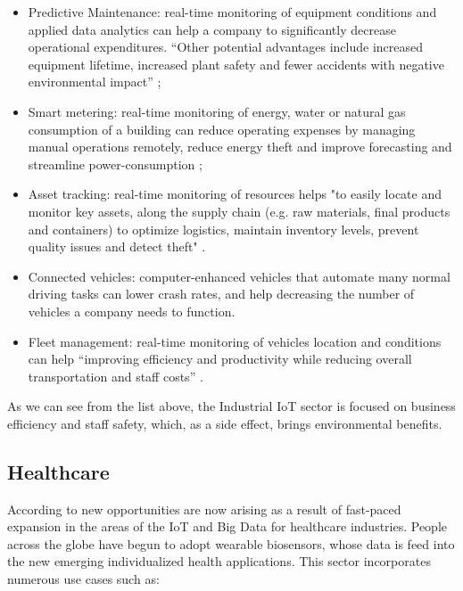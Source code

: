 \begin{itemize}
    \item Predictive Maintenance: real-time monitoring of equipment conditions and applied data analytics can help a company to significantly decrease operational expenditures. ``Other potential advantages include increased equipment lifetime, increased plant safety and fewer accidents with negative environmental impact'' \parencite{iiot-cases};
    \item Smart metering: real-time monitoring of energy, water or natural gas consumption of a building can reduce operating expenses by managing manual operations remotely, reduce energy theft and improve forecasting and streamline power-consumption \parencite{metering-sierra};
    \item Asset tracking: real-time monitoring of resources helps "to easily locate and monitor key assets, along the supply chain (e.g. raw materials, final products and containers) to optimize logistics, maintain inventory levels, prevent quality issues and detect theft" \parencite{iiot-cases}.
    \item Connected vehicles: computer-enhanced vehicles that automate many normal driving tasks can lower crash rates, and help decreasing the number of vehicles a company needs to function.
    \item Fleet management: real-time monitoring of vehicles location and conditions can help ``improving efficiency and productivity while reducing overall transportation and staff costs'' \parencite{iiot-cases}.
\end{itemize}

As we can see from the list above, the Industrial \gls{IoT} sector is focused on business efficiency and staff safety, which, as a side effect, brings environmental benefits.

\subsection{Healthcare}
\label{subsec:stateofart:areas:healthcare}

According to \cite{FIROUZI2018583} new opportunities are now arising as a result of fast-paced expansion in the areas of the \gls{IoT} and Big Data for healthcare industries. People across the globe have begun to adopt wearable biosensors, whose data is feed into the new emerging individualized health applications.
This sector incorporates numerous use cases \parencite{iot-healthcare} such as:

